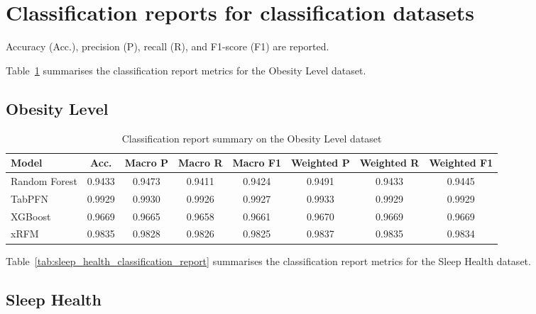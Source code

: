 \clearpage
\section{Classification reports for classification datasets}

Accuracy (Acc.), precision (P), recall (R), and F1-score (F1) are reported. 

Table~\ref{tab:obesity_classification_report} summarises the classification report metrics for the Obesity Level dataset.

\subsection{Obesity Level}

\begin{table}[H]
  \centering
  \caption{Classification report summary on the Obesity Level dataset}
  \small
  \begin{tabular}{lccccccc}
    \toprule
    \textbf{Model} & \textbf{Acc.} 
    & \textbf{Macro P} & \textbf{Macro R} & \textbf{Macro F1}
    & \textbf{Weighted P} & \textbf{Weighted R} & \textbf{Weighted F1} \\
    \midrule
    Random Forest & 0.9433 & 0.9473 & 0.9411 & 0.9424 & 0.9491 & 0.9433 & 0.9445 \\
    TabPFN        & 0.9929 & 0.9930 & 0.9926 & 0.9927 & 0.9933 & 0.9929 & 0.9929 \\
    XGBoost       & 0.9669 & 0.9665 & 0.9658 & 0.9661 & 0.9670 & 0.9669 & 0.9669 \\
    xRFM          & 0.9835 & 0.9828 & 0.9826 & 0.9825 & 0.9837 & 0.9835 & 0.9834 \\
    \bottomrule
  \end{tabular}
  \label{tab:obesity_classification_report}
\end{table}


Table~\ref{tab:sleep_health_classification_report} summarises the classification report metrics for the Sleep Health dataset.
\subsection{Sleep Health}

